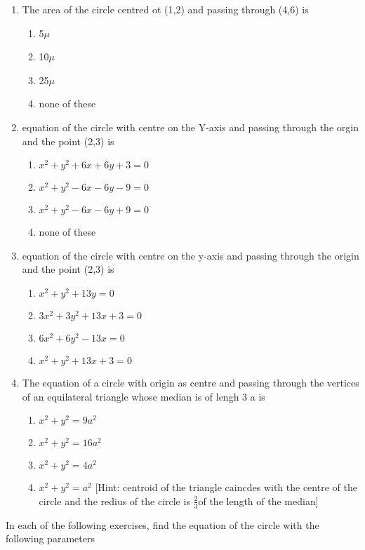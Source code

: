 \begin{enumerate}[label=\thesection.\arabic*,ref=\thesection.\theenumi]
\item The area of the circle centred ot (1,2) and passing through (4,6) is
\begin{enumerate}
\item 5$\mu$ 
\item 10$\mu$
 \item 25$\mu$ 
\item none of these
\end{enumerate}
\item equation of the circle with centre on the Y-axis and passing through the orgin and the point (2,3) is
\begin{enumerate}
\item $x^2+y^2+6x+6y+3=0$ 
\item $x^2+y^2-6x-6y-9=0$
\item $x^2+y^2-6x-6y+9=0$
\item none of these
\end{enumerate}
\item equation of the circle with centre on the  y-axis and passing through the origin and the point (2,3) is  
\begin{enumerate}
\item $x^2+y^2+13y=0$
\item $3x^2+3y^2+13x+3=0$
\item $6x^2+6y^2-13x=0$
\item $x^2+y^2+13x+3=0$
\end{enumerate}
\item The equation of a circle with origin as centre and passing through the vertices of an equilateral triangle whose median is of lengh 3 a is
\begin{enumerate}
\item $x^2+y^2=9a^2$
\item $x^2+y^2=16a^2$
\item $x^2+y^2=4a^2$
\item $x^2+y^2=a^2$
	[Hint: centroid of the triangle caincdes with the centre of the circle and the redius of the circle is $\frac{2}{3}$of the length of the median]
\end{enumerate}
\end{enumerate}
In each of the following exercises, find the equation of the circle with the following parameters
